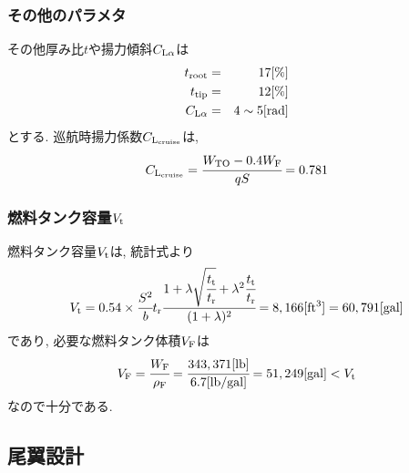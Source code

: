 \documentclass[12pt]{jsarticle}
\begin{document}
\subsubsection{その他のパラメタ}
その他厚み比$t$や揚力傾斜$C_{\rm L\alpha}$は
\begin{eqnarray*}
t_{\rm root} &=& 17 [\%] \\
t_{\rm tip} &=& 12 [{\%}] \\
C_{\rm L\alpha} &=& 4\sim 5 [{\rm rad}]
\end{eqnarray*}
とする. 巡航時揚力係数$C_{\rm L_{cruise}}$は, 
\begin{eqnarray*}
C_{\rm L_{cruise}} = \cfrac{W_{\rm TO} - 0.4W_{\rm F}}{qS} = 0.781
\end{eqnarray*}

\subsubsection{燃料タンク容量$V_{\rm t}$}
燃料タンク容量$V_{\rm t}$は, 統計式より
\begin{eqnarray*}
V_{\rm t} = 0.54 \times \cfrac{S^2}{b}t_{\rm r}\cfrac{1+\lambda\sqrt{\cfrac{t_{\rm t}}{t_{\rm r}}} + \lambda^2 \cfrac{t_{\rm t}}{t_
{\rm r}}}{(1+\lambda)^2} = 8,166 [{\rm ft^3} ] = 60, 791 [{\rm gal}]
\end{eqnarray*}
であり, 必要な燃料タンク体積$V_{\rm F}$は
\begin{eqnarray*}
V_{\rm F} = \cfrac{W_{\rm F}}{\rho_{\rm F}} = \cfrac{343,371 [{\rm lb}]}{6.7 [{\rm lb/gal}]} = 51,249 [{\rm gal}] < V_{\rm t}
\end{eqnarray*}
なので十分である.

\subsection{尾翼設計}
\end{document}
